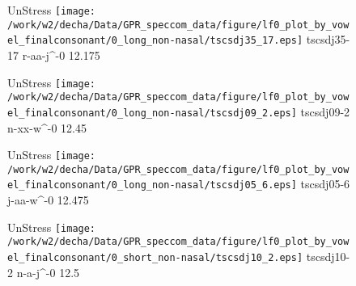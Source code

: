 \documentclass{article}
\begin{document}
\begin{figure}[t]
\begin{minipage}[b]{.24\textwidth}
UnStress
\centering
\texttt{[image: /work/w2/decha/Data/GPR\_speccom\_data/figure/lf0\_plot\_by\_vowel\_finalconsonant/0\_long\_non-nasal/tscsdj35\_17.eps]}
tscsdj35-17 r-aa-j\textasciicircum-0 12.175
\end{minipage}
\begin{minipage}[b]{.24\textwidth}
UnStress
\centering
\texttt{[image: /work/w2/decha/Data/GPR\_speccom\_data/figure/lf0\_plot\_by\_vowel\_finalconsonant/0\_long\_non-nasal/tscsdj09\_2.eps]}
tscsdj09-2 n-xx-w\textasciicircum-0 12.45
\end{minipage}
\begin{minipage}[b]{.24\textwidth}
UnStress
\centering
\texttt{[image: /work/w2/decha/Data/GPR\_speccom\_data/figure/lf0\_plot\_by\_vowel\_finalconsonant/0\_long\_non-nasal/tscsdj05\_6.eps]}
tscsdj05-6 j-aa-w\textasciicircum-0 12.475
\end{minipage}
\begin{minipage}[b]{.24\textwidth}
UnStress
\centering
\texttt{[image: /work/w2/decha/Data/GPR\_speccom\_data/figure/lf0\_plot\_by\_vowel\_finalconsonant/0\_short\_non-nasal/tscsdj10\_2.eps]}
tscsdj10-2 n-a-j\textasciicircum-0 12.5
\end{minipage}
\end{figure}
\end{document}
